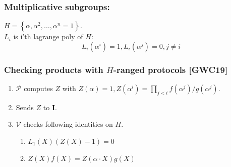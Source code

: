 \documentclass[shadesubsections,compress,14pt,mathserif]{beamer}
\newcommand{\set}[1]{\ensuremath{\left\{#1\right\}}}
\newcommand{\enc}[1]{\ensuremath{\left[#1\right ]}}
\newcommand{\cm}{\ensuremath{\mathsf{cm}}}
\newcommand{\open}[1]{\ensuremath{\mathsf{open}(#1)}}
\newcommand{\verify}[1]{\ensuremath{\mathsf{verify}(#1)}}
\newcommand{\defeq}{\ensuremath{:=}}
\newcommand{\ver}{\ensuremath{\mathcal{V}}}
\newcommand{\prv}{\ensuremath{\mathcal{P}}}
\newcommand{\ideal}{\mathbf{I}}
\newcommand{\gen}{\alpha}
\begin{document}
\begin{frame}
\frametitle{Multiplicative subgroups:}   %
 $H=\set{\gen,\gen^2,\ldots,\gen^n=1}$.\\
 \vspace{0.2in}
 $L_i$ is i'th lagrange poly of $H$:
 \[L_i(\alpha^i)=1,L_i(\alpha^j) =0, j\neq i\]
\end{frame}


\begin{frame}
\frametitle{Checking products with $H$-ranged protocols \small{[GWC19]}}   %
 \begin{enumerate}
  \item $\prv$ computes $Z$ with 
  $ Z(\gen)=1, Z(\gen^i) = \prod_{j<i}  f(\gen^j)/g(\gen^j)$.
  \item Sends $Z$ to $\ideal$.   \pause
  \item $\ver$ checks following identities on $H$.
  \begin{enumerate}
   \item $L_1(X) (Z(X)-1) =0$
   \item $Z(X) f(X) = Z(\gen\cdot X)g(X)$\pause
 \end{enumerate}

 \end{enumerate}
 \vspace{0.2in}


\end{frame}

% 
% 
% 
%  
% 
% 
% 
% 
% 
\end{document}
